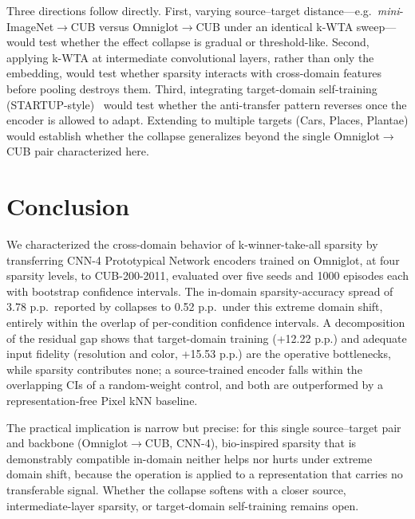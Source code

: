 \documentclass[11pt]{article}
\begin{document}
Three directions follow directly. First, varying source--target distance---e.g.\ \emph{mini}-ImageNet$\to$CUB versus Omniglot$\to$CUB under an identical k-WTA sweep---would test whether the effect collapse is gradual or threshold-like. Second, applying k-WTA at intermediate convolutional layers, rather than only the embedding, would test whether sparsity interacts with cross-domain features before pooling destroys them. Third, integrating target-domain self-training (STARTUP-style)~\citep{phoo2021self} would test whether the anti-transfer pattern reverses once the encoder is allowed to adapt. Extending to multiple targets (Cars, Places, Plantae) would establish whether the collapse generalizes beyond the single Omniglot$\to$CUB pair characterized here.

\section{Conclusion}
\label{sec:conclusion}

We characterized the cross-domain behavior of k-winner-take-all sparsity by transferring CNN-4 Prototypical Network encoders trained on Omniglot, at four sparsity levels, to CUB-200-2011, evaluated over five seeds and 1000 episodes each with bootstrap confidence intervals. The in-domain sparsity-accuracy spread of 3.78 p.p.\ reported by \citet{pinho2026kwta} collapses to 0.52 p.p.\ under this extreme domain shift, entirely within the overlap of per-condition confidence intervals. A decomposition of the residual gap shows that target-domain training (+12.22 p.p.) and adequate input fidelity (resolution and color, +15.53 p.p.) are the operative bottlenecks, while sparsity contributes none; a source-trained encoder falls within the overlapping CIs of a random-weight control, and both are outperformed by a representation-free Pixel kNN baseline.

The practical implication is narrow but precise: for this single source--target pair and backbone (Omniglot$\to$CUB, CNN-4), bio-inspired sparsity that is demonstrably compatible in-domain neither helps nor hurts under extreme domain shift, because the operation is applied to a representation that carries no transferable signal. Whether the collapse softens with a closer source, intermediate-layer sparsity, or target-domain self-training remains open.


\end{document}
